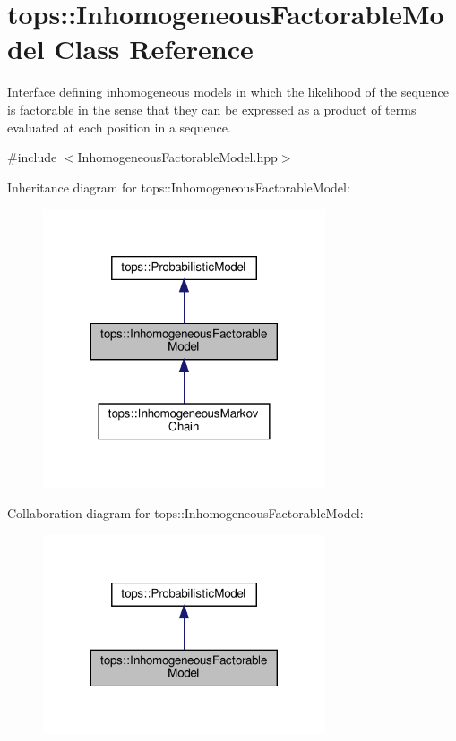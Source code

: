 \hypertarget{classtops_1_1InhomogeneousFactorableModel}{}\section{tops\+:\+:Inhomogeneous\+Factorable\+Model Class Reference}
\label{classtops_1_1InhomogeneousFactorableModel}


Interface defining inhomogeneous models in which the likelihood of the sequence is factorable in the sense that they can be expressed as a product of terms evaluated at each position in a sequence.  




{\ttfamily \#include $<$Inhomogeneous\+Factorable\+Model.\+hpp$>$}



Inheritance diagram for tops\+:\+:Inhomogeneous\+Factorable\+Model\+:
\nopagebreak
\begin{figure}[H]
\begin{center}
\leavevmode
\includegraphics[width=236pt]{classtops_1_1InhomogeneousFactorableModel__inherit__graph}
\end{center}
\end{figure}


Collaboration diagram for tops\+:\+:Inhomogeneous\+Factorable\+Model\+:
\nopagebreak
\begin{figure}[H]
\begin{center}
\leavevmode
\includegraphics[width=236pt]{classtops_1_1InhomogeneousFactorableModel__coll__graph}
\end{center}
\end{figure}
